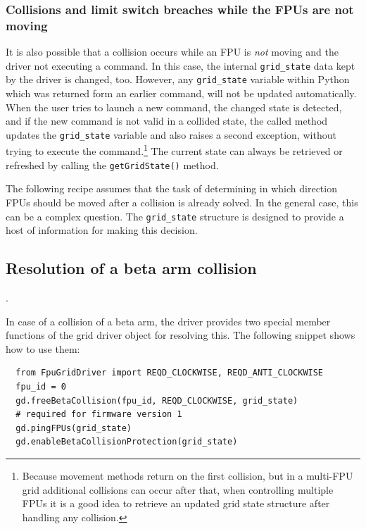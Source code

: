 \documentclass[11pt,a4paper]{report}
\begin{document}
\subsubsection{Collisions and limit switch breaches while the FPUs are not moving}
 It is also possible that
a collision occurs while an FPU is \emph{not} moving and the driver
not executing a command.  In this case, the internal
\texttt{grid\_state} data kept by the driver is changed, too. However,
any \texttt{grid\_state} variable within Python which was returned
form an earlier command, will not be updated automatically. When the
user tries to launch a new command, the changed state is detected, and
if the new command is not valid in a collided state, the called method
updates the \texttt{grid\_state} variable and also raises a second
exception, without trying to execute the command.\footnote{Because
  movement methods return on the first collision, but in a multi-FPU
  grid additional collisions can occur after that, when controlling
  multiple FPUs it is a good idea to retrieve an updated grid state
  structure after handling any collision.}  The current state can
always be retrieved or refreshed by calling the
\texttt{getGridState()} method.

The following recipe assumes that the task of determining in which
direction FPUs should be moved after a collision is already solved.
In the general case, this can be a complex question. The
\texttt{grid\_state} structure is designed to provide a host of
information for making this decision.

\subsection{Resolution of a beta arm collision}
\label{sec:betacollisionresolution}.

In case of a collision of a beta arm, the driver provides two special
member functions of the grid driver object for resolving this. The
following snippet shows how to use them:

\begin{verbatim}
  from FpuGridDriver import REQD_CLOCKWISE, REQD_ANTI_CLOCKWISE
  fpu_id = 0
  gd.freeBetaCollision(fpu_id, REQD_CLOCKWISE, grid_state)
  # required for firmware version 1
  gd.pingFPUs(grid_state)
  gd.enableBetaCollisionProtection(grid_state)
\end{verbatim}
\end{document}

